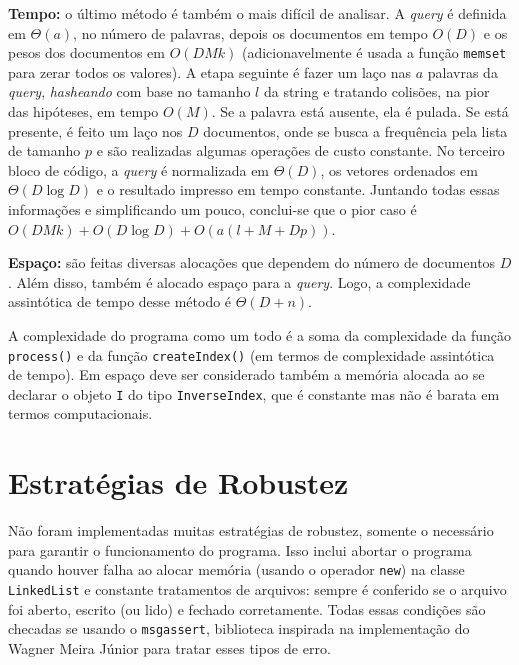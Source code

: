 \documentclass{article}
\def\code#1{\texttt{#1}}
\begin{document}
\begin{itemize}
	      \textbf{Tempo:} o último método é também o mais difícil de analisar. A \textit{query} é definida em \( \Theta(a) \), no número de palavras, depois os documentos em tempo \( O(D) \) e os pesos dos documentos em \( O(DMk) \) (adicionavelmente é usada a função \code{memset} para zerar todos os valores). A etapa seguinte é fazer um laço nas \( a \) palavras da \textit{query}, \textit{hasheando} com base no tamanho \( l \) da string e tratando colisões, na pior das hipóteses, em tempo \( O(M) \). Se a palavra está ausente, ela é pulada. Se está presente, é feito um laço nos \( D \) documentos, onde se busca a frequência pela lista de tamanho \( p \) e são realizadas algumas operações de custo constante. No terceiro bloco de código, a \textit{query} é normalizada em \( \Theta(D) \), os vetores ordenados em \( \Theta(D \log D) \) e o resultado impresso em tempo constante. Juntando todas essas informações e simplificando um pouco, conclui-se que o pior caso é \( O(DMk) + O(D \log D) + O(a(l+M+Dp)) \).

	      \textbf{Espaço:} são feitas diversas alocações que dependem do número de documentos \( D \). Além disso, também é alocado espaço para a \textit{query}. Logo, a complexidade assintótica de tempo desse método é \( \Theta(D+n) \).

\end{itemize}

A complexidade do programa como um todo é a soma da complexidade da função \code{process()} e da função \code{createIndex()} (em termos de complexidade assintótica de tempo). Em espaço deve ser considerado também a memória alocada ao se declarar o objeto \code{I} do tipo \code{InverseIndex}, que é constante mas não é barata em termos computacionais.

\section{Estratégias de Robustez}

Não foram implementadas muitas estratégias de robustez, somente o necessário para garantir o funcionamento do programa. Isso inclui abortar o programa quando houver falha ao alocar memória (usando o operador \code{new}) na classe \code{LinkedList} e constante tratamentos de arquivos: sempre é conferido se o arquivo foi aberto, escrito (ou lido) e fechado corretamente. Todas essas condições são checadas se usando o \code{msgassert}, biblioteca inspirada na implementação do Wagner Meira Júnior para tratar esses tipos de erro.
\end{document}
